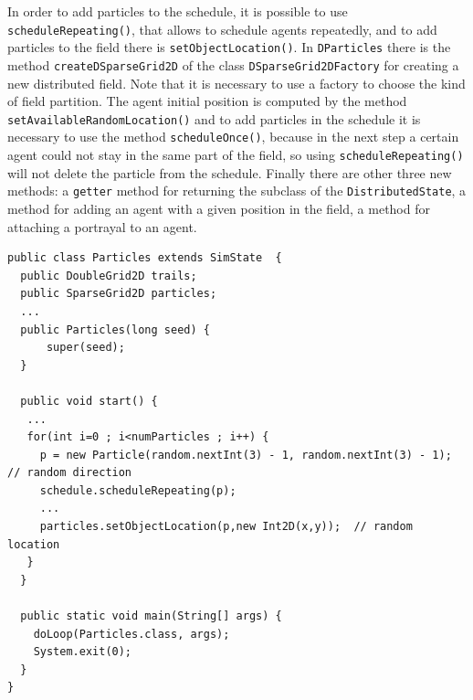 \documentclass{article}
\begin{document}
In order to add particles to the schedule, it is possible to use \texttt{scheduleRepeating()}, that allows to schedule agents repeatedly, and to add particles to the field there is \texttt{setObjectLocation()}. In \texttt{DParticles} there is the method \texttt{createDSparseGrid2D} of the class \texttt{DSparseGrid2DFactory} for creating a new distributed field. Note that it is necessary to use a factory to choose the kind of field partition. The agent initial position is computed by the method \texttt{setAvailableRandomLocation()} and to add particles in the schedule it is necessary to use the method \texttt{scheduleOnce()}, because in the next step a certain agent could not stay in the same part of the field, so using \texttt{scheduleRepeating()} will not delete the particle from the schedule. Finally there are other three new methods: a \texttt{getter} method for returning the subclass of the \texttt{DistributedState}, a method for adding an agent with a given position in the field, a method for attaching a portrayal to an agent.

\begin{lstlisting}
public class Particles extends SimState  {
  public DoubleGrid2D trails;
  public SparseGrid2D particles;
  ...
  public Particles(long seed) {
      super(seed);
  }
  
  public void start() {
   ...
   for(int i=0 ; i<numParticles ; i++) {
     p = new Particle(random.nextInt(3) - 1, random.nextInt(3) - 1);  // random direction
     schedule.scheduleRepeating(p);
     ...
     particles.setObjectLocation(p,new Int2D(x,y));  // random location
   }
  }
  
  public static void main(String[] args) {
    doLoop(Particles.class, args);
    System.exit(0);
  }
}
\end{lstlisting}
\end{document}
